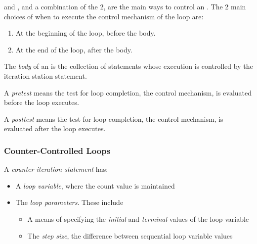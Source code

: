  and , and a combination of the 2, are the main ways to control an .
The 2 main choices of when to execute the control mechanism of the loop are:
\begin{enumerate}[noitemsep]
\item At the beginning of the loop, before the body. 
\item At the end of the loop, after the body. 
\end{enumerate}

\begin{definition}[Body]\label{def:Iterative_Statement-Body}
  The \emph{body} of an  is the collection of statements whose execution is controlled by the iteration station statement.
\end{definition}

\begin{definition}[Pretest]\label{def:Iterative_Statement-Pretest_Control}
  A \emph{pretest}  means the test for loop completion, the control mechanism, is evaluated before the loop  executes.
\end{definition}

\begin{definition}[Posttest]\label{def:Iterative_Statement-Posttest_Control}
  A \emph{posttest}  means the test for loop completion, the control mechanism, is evaluated after the loop  executes.
\end{definition}

\subsubsection{Counter-Controlled Loops}\label{subsubsec:Counter_Controlled_Loops}
\begin{definition}\label{def:Counter_Iteration_Statement}
  A \emph{counter iteration statement} has:
  \begin{itemize}[noitemsep]
  \item A \emph{loop variable}, where the count value is maintained
  \item The \emph{loop parameters}. These include
    \begin{itemize}[noitemsep]
    \item A means of specifying the \emph{initial} and \emph{terminal} values of the loop variable
    \item The \emph{step size}, the difference between sequential loop variable values
    \end{itemize}
  \end{itemize}
\end{definition}

